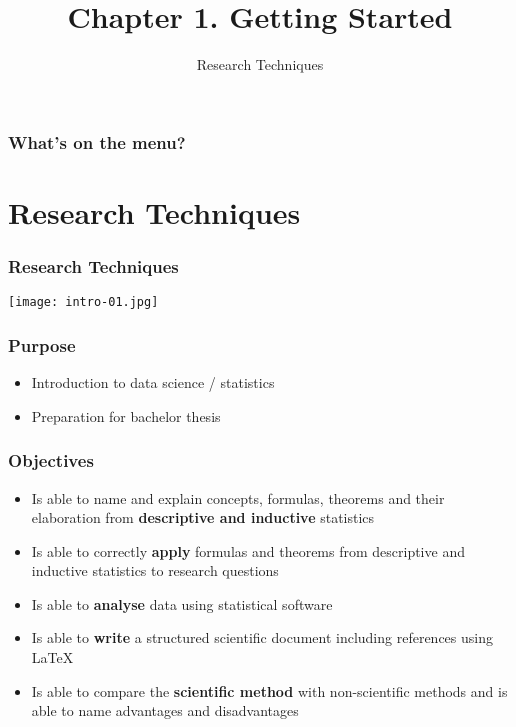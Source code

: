 \documentclass[aspectratio=169]{beamer}
\title{Chapter 1. Getting Started}
\subtitle{Research Techniques}
\begin{document}
\begin{frame}
  \maketitle
\end{frame}

\begin{frame}
  \frametitle{What's on the menu?}
  
  \tableofcontents
\end{frame}

\section{Research Techniques}

\begin{frame}
  \frametitle{Research Techniques}
  
  \centering
  \texttt{[image: intro-01.jpg]}
\end{frame}

\begin{frame}
  \frametitle{Purpose}
  
  \begin{itemize}
    \item Introduction to data science / statistics
    \item Preparation for bachelor thesis
  \end{itemize}
\end{frame}

\begin{frame}
  \frametitle{Objectives}
  
  \begin{itemize}
    \item Is able to name and explain concepts, formulas, theorems and their elaboration from \textbf{descriptive and inductive} statistics
    \item Is able to correctly \textbf{apply} formulas and theorems from descriptive and inductive statistics to research questions
    \item Is able to \textbf{analyse} data using statistical software
    \item Is able to \textbf{write} a structured scientific document including references using \LaTeX{}    
    \item Is able to compare the \textbf{scientific method} with non-scientific methods and is able to name advantages and disadvantages
  \end{itemize}
\end{frame}
\end{document}
